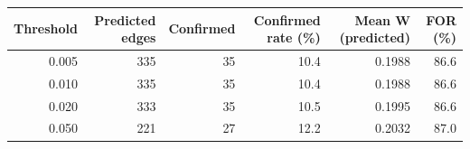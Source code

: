\begin{tabular}{rrrrrr}
\toprule
Threshold & Predicted edges & Confirmed & Confirmed rate (\%) & Mean W (predicted) & FOR (\%) \\
\midrule
0.005 & 335 & 35 & 10.4 & 0.1988 & 86.6 \\
0.010 & 335 & 35 & 10.4 & 0.1988 & 86.6 \\
0.020 & 333 & 35 & 10.5 & 0.1995 & 86.6 \\
0.050 & 221 & 27 & 12.2 & 0.2032 & 87.0 \\
\bottomrule
\end{tabular}
